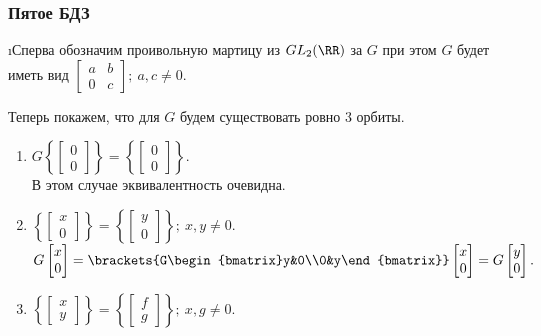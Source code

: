 \subsubsection{Пятое БДЗ}


\i Сперва обозначим проивольную мартицу из $GL_2(\RR)$ за $G$ при этом $G$ будет иметь вид $\begin{bmatrix} a & b\\ 0&c \end{bmatrix};\ a,c \ne 0$.
\par Теперь покажем, что для $G$ будем существовать ровно 3 орбиты.
\begin{enumerate}
    \item $G \left\{\begin{bmatrix}0\\0\end{bmatrix}\right\} = \left\{\begin{bmatrix}0\\0\end{bmatrix}\right\}$.\\
    В этом случае эквивалентность очевидна.
    \item $\left\{\begin{bmatrix}x\\0\end{bmatrix}\right\} = \left\{\begin{bmatrix}y\\0\end{bmatrix}\right\};\ x,y \ne 0.$\\
    $G \begin{bmatrix}x\\0\end{bmatrix} = \brackets{G\begin{bmatrix}y&0\\0&y\end{bmatrix}} \begin{bmatrix}x\\0\end{bmatrix} = G\begin{bmatrix}y\\0\end{bmatrix}.$
    \item $\left\{\begin{bmatrix}x\\y\end{bmatrix}\right\} = \left\{\begin{bmatrix}f\\g\end{bmatrix}\right\};\ x,g \ne 0.$\\

\end{enumerate}
